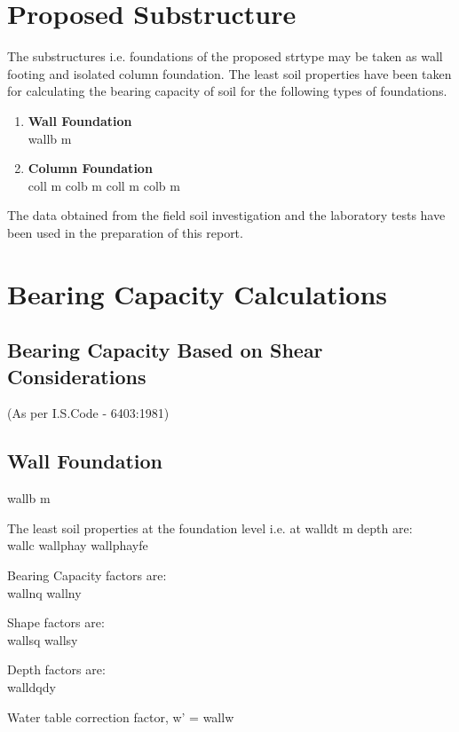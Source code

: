 \documentclass{soil12}
\begin{document}
\section{Proposed Substructure}
The substructures i.e. foundations of the proposed {{strtype}} may be taken as wall footing and isolated
column foundation. The least soil properties have been taken for calculating the bearing capacity of
soil for the following types of foundations.
\begin{enumerate}
\item{\large{\textbf{Wall Foundation}}}\\
{
{{wallb}}
 m}
\item{\large{\textbf{Column Foundation}}}\\
{
{{coll}}
 m}
{
{{colb}}
 m}
{
{{coll}}
 m}
{
{{colb}}
 m}
\end{enumerate}
The data obtained from the field soil investigation and the laboratory tests have been used in the
preparation of this report.
\section{Bearing Capacity Calculations}
\subsection{Bearing Capacity Based on Shear Considerations}
(As per I.S.Code - 6403:1981)
\subsection{Wall Foundation}
{
{{wallb}}
 m}

The least soil properties at the foundation level i.e. at {{walldt}} m depth are:\\
{
{{wallc}}
}
{
{{wallphay}}
}
{
{{wallphayfe}}
}

Bearing Capacity factors are:\\
{ 
{{wallnq}}
}
{
{{wallny}}
}

Shape factors are:\\
{
{{wallsq}}
}
{
{{wallsy}}
}

Depth factors are:\\    
{
{{walldqdy}}
}

Water table correction factor, w' = {{wallw}} \\
\end{document}
